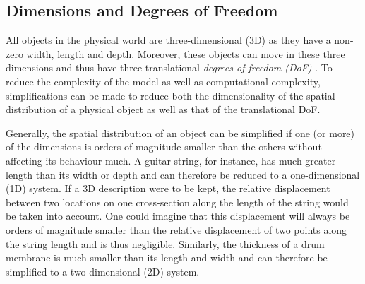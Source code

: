

\subsection{Dimensions and Degrees of Freedom}\label{sec:dimensions}
All objects in the physical world are three-dimensional (3D) as they have a non-zero width, length and depth. Moreover, these objects can move in these three dimensions and thus have three translational \textit{degrees of freedom (DoF)} . 
To reduce the complexity of the model as well as computational complexity, simplifications can be made to reduce both the dimensionality of the spatial distribution of a physical object as well as that of the translational DoF. 

Generally, the spatial distribution of an object can be simplified if one (or more) of the dimensions is orders of magnitude smaller than the others without affecting its behaviour much. A guitar string, for instance, has much greater length than its width or depth and can therefore be reduced to a one-dimensional (1D) system. If a 3D description were to be kept, the relative displacement between two locations on one cross-section along the length of the string would be taken into account. One could imagine that this displacement will always be orders of magnitude smaller than the relative displacement of two points along the string length and is thus negligible. Similarly, the thickness of a drum membrane is much smaller than its length and width and can therefore be simplified to a two-dimensional (2D) system. 

